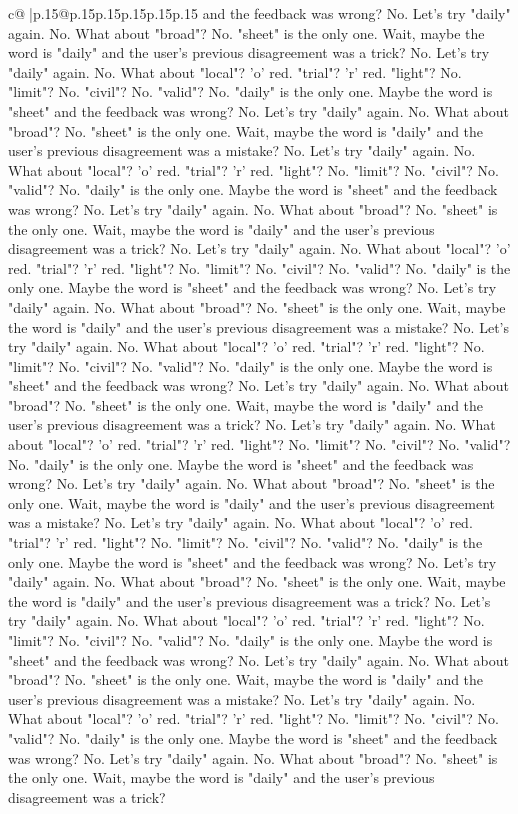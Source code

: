 \documentclass{article}
\begin{document}
{\begin{supertabular}{c@{$\;$}|p{.15\linewidth}@{}p{.15\linewidth}p{.15\linewidth}p{.15\linewidth}p{.15\linewidth}p{.15\linewidth}}
{{{and the feedback was wrong? No. Let's try "daily" again. No. What about "broad"? No. "sheet" is the only one. Wait, maybe the word is "daily" and the user's previous disagreement was a trick? No. Let's try "daily" again. No. What about "local"? 'o' red. "trial"? 'r' red. "light"? No. "limit"? No. "civil"? No. "valid"? No. "daily" is the only one. Maybe the word is "sheet" and the feedback was wrong? No. Let's try "daily" again. No. What about "broad"? No. "sheet" is the only one. Wait, maybe the word is "daily" and the user's previous disagreement was a mistake? No. Let's try "daily" again. No. What about "local"? 'o' red. "trial"? 'r' red. "light"? No. "limit"? No. "civil"? No. "valid"? No. "daily" is the only one. Maybe the word is "sheet" and the feedback was wrong? No. Let's try "daily" again. No. What about "broad"? No. "sheet" is the only one. Wait, maybe the word is "daily" and the user's previous disagreement was a trick? No. Let's try "daily" again. No. What about "local"? 'o' red. "trial"? 'r' red. "light"? No. "limit"? No. "civil"? No. "valid"? No. "daily" is the only one. Maybe the word is "sheet" and the feedback was wrong? No. Let's try "daily" again. No. What about "broad"? No. "sheet" is the only one. Wait, maybe the word is "daily" and the user's previous disagreement was a mistake? No. Let's try "daily" again. No. What about "local"? 'o' red. "trial"? 'r' red. "light"? No. "limit"? No. "civil"? No. "valid"? No. "daily" is the only one. Maybe the word is "sheet" and the feedback was wrong? No. Let's try "daily" again. No. What about "broad"? No. "sheet" is the only one. Wait, maybe the word is "daily" and the user's previous disagreement was a trick? No. Let's try "daily" again. No. What about "local"? 'o' red. "trial"? 'r' red. "light"? No. "limit"? No. "civil"? No. "valid"? No. "daily" is the only one. Maybe the word is "sheet" and the feedback was wrong? No. Let's try "daily" again. No. What about "broad"? No. "sheet" is the only one. Wait, maybe the word is "daily" and the user's previous disagreement was a mistake? No. Let's try "daily" again. No. What about "local"? 'o' red. "trial"? 'r' red. "light"? No. "limit"? No. "civil"? No. "valid"? No. "daily" is the only one. Maybe the word is "sheet" and the feedback was wrong? No. Let's try "daily" again. No. What about "broad"? No. "sheet" is the only one. Wait, maybe the word is "daily" and the user's previous disagreement was a trick? No. Let's try "daily" again. No. What about "local"? 'o' red. "trial"? 'r' red. "light"? No. "limit"? No. "civil"? No. "valid"? No. "daily" is the only one. Maybe the word is "sheet" and the feedback was wrong? No. Let's try "daily" again. No. What about "broad"? No. "sheet" is the only one. Wait, maybe the word is "daily" and the user's previous disagreement was a mistake? No. Let's try "daily" again. No. What about "local"? 'o' red. "trial"? 'r' red. "light"? No. "limit"? No. "civil"? No. "valid"? No. "daily" is the only one. Maybe the word is "sheet" and the feedback was wrong? No. Let's try "daily" again. No. What about "broad"? No. "sheet" is the only one. Wait, maybe the word is "daily" and the user's previous disagreement was a trick? }}}
\end{supertabular}}
\end{document}

